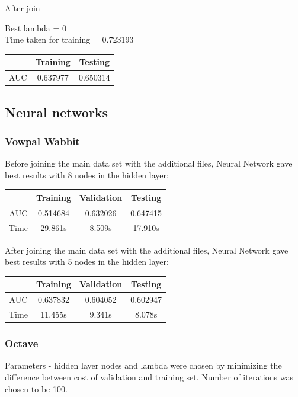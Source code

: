 \documentclass[10pt]{article}
\begin{document}
After join

	Best lambda = 0
\\
	Time taken for training = 0.723193
\\
\begin{center}
 \begin{tabular}{|c | c | c ||} 
 \hline
 & Training & Testing\\ [0.5ex] 
 \hline\hline
AUC & 0.637977 & 0.650314\\
 \hline
\end{tabular}
\end{center}


\subsection{Neural networks}
\subsubsection{Vowpal Wabbit}
Before joining the main data set with the additional files, Neural Network gave best results with 8 nodes in the hidden layer:\\

\begin{center}
 \begin{tabular}{|c | c | c | c||} 
 \hline
 & Training & Validation & Testing\\ [0.5ex] 
 \hline\hline
AUC & 0.514684 & 0.632026 & 0.647415\\
 \hline
Time & 29.861s & 8.509s & 17.910s\\ 
 \hline
\end{tabular}
\end{center}

After joining the main data set with the additional files, Neural Network gave best results with 5 nodes in the hidden layer:\\

\begin{center}
 \begin{tabular}{|c | c | c | c||} 
 \hline
 & Training & Validation & Testing\\ [0.5ex] 
 \hline\hline
AUC & 0.637832 & 0.604052 & 0.602947\\
 \hline
Time & 11.455s & 9.341s & 8.078s\\ 
 \hline
\end{tabular}
\end{center}

\subsubsection{Octave}
Parameters - hidden layer nodes and lambda were chosen by minimizing the difference between cost of validation and training set. Number of iterations was chosen to be 100.
\\
\end{document}

